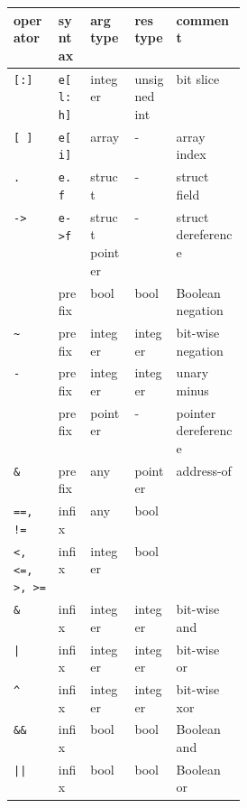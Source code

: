 \begin{table}
\begin{small}
\noindent
\begin{tabular}{|l|l|l|l|p{0.3\linewidth}|}
    \hline
    {\bf operator}                   & {\bf syntax} & {\bf arg type} & {\bf res type} & {\bf comment} \\
    \hline
    \hline 
    {\tt[:]}                         & {\tt e[l:h]} & integer        & unsigned int   & bit slice \\
    {\tt[~]}                         & {\tt e[i]}   & array          & -              & array index \\
    {\tt.}                           & {\tt e.f}    & struct         & -              & struct field \\
    {\tt\verb=->=}                   & {\tt\verb=e->f=}  & struct pointer & -              & struct dereference \\
    \hline
    \src{!}                          & prefix  & bool           & bool           & Boolean negation \\
    {\tt\verb=~=}                    & prefix  & integer        & integer        & bit-wise negation \\
    {\tt-}                           & prefix  & integer        & integer        & unary minus \\
    {\tt*}                           & prefix  & pointer        & -              & pointer dereference \\
    {\tt \&}                         & prefix  & any            & pointer        & address-of \\
    \hline
    {\tt ==, !=}                     & infix   & any            & bool           & \\
    {\tt\verb#<, <=, >, >=#}         & infix   & integer        & bool           & \\
    \hline    
    {\tt\&}                          & infix   & integer        & integer        & bit-wise and \\
    \hline    
    {\tt |}                          & infix   & integer        & integer        & bit-wise or \\
    \hline    
    {\tt\verb#^#}                    & infix   & integer        & integer        & bit-wise xor \\
    \hline    
    {\tt\&\&}                        & infix   & bool           & bool           & Boolean and \\
    \hline    
    {\tt||}                          & infix   & bool           & bool           & Boolean or \\

\end{tabular}
\end{small}
\end{table}
